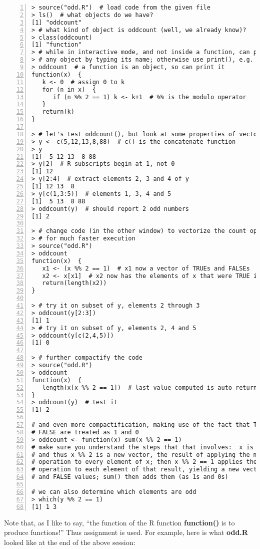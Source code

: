 \begin{lstlisting}[numbers=left]
> source("odd.R")  # load code from the given file
> ls()  # what objects do we have?
[1] "oddcount"
> # what kind of object is oddcount (well, we already know)?
> class(oddcount)
[1] "function"
> # while in interactive mode, and not inside a function, can print 
> # any object by typing its name; otherwise use print(), e.g. print(x+y)
> oddcount  # a function is an object, so can print it
function(x)  {
   k <- 0  # assign 0 to k
   for (n in x)  {
      if (n %% 2 == 1) k <- k+1  # %% is the modulo operator
   }
   return(k)
}

> # let's test oddcount(), but look at some properties of vectors first
> y <- c(5,12,13,8,88)  # c() is the concatenate function
> y
[1]  5 12 13  8 88
> y[2]  # R subscripts begin at 1, not 0
[1] 12
> y[2:4]  # extract elements 2, 3 and 4 of y
[1] 12 13  8
> y[c(1,3:5)]  # elements 1, 3, 4 and 5
[1]  5 13  8 88
> oddcount(y)  # should report 2 odd numbers
[1] 2

> # change code (in the other window) to vectorize the count operation,
> # for much faster execution
> source("odd.R")
> oddcount
function(x)  {
   x1 <- (x %% 2 == 1)  # x1 now a vector of TRUEs and FALSEs
   x2 <- x[x1]  # x2 now has the elements of x that were TRUE in x1
   return(length(x2))
}

> # try it on subset of y, elements 2 through 3
> oddcount(y[2:3])
[1] 1
> # try it on subset of y, elements 2, 4 and 5
> oddcount(y[c(2,4,5)])
[1] 0

> # further compactify the code
> source("odd.R")
> oddcount
function(x)  {
   length(x[x %% 2 == 1])  # last value computed is auto returned
}
> oddcount(y)  # test it
[1] 2

# and even more compactification, making use of the fact that TRUE and
# FALSE are treated as 1 and 0
> oddcount <- function(x) sum(x %% 2 == 1)
# make sure you understand the steps that that involves:  x is a vector,
# and thus x %% 2 is a new vector, the result of applying the mod 2
# operation to every element of x; then x %% 2 == 1 applies the == 1
# operation to each element of that result, yielding a new vector of TRUE
# and FALSE values; sum() then adds them (as 1s and 0s)

# we can also determine which elements are odd
> which(y %% 2 == 1)
[1] 1 3
\end{lstlisting}

Note that, as I like to say, ``the function of the R function {\bf
function()} is to produce functions!'' Thus assignment is used. For
example, here is what {\bf odd.R} looked like at the end of the above
session:

